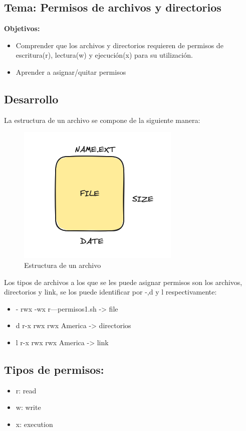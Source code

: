 \documentclass[11pt,twoside]{book}
\begin{document}
\subsection{Tema: Permisos de archivos y directorios}

\textbf{Objetivos:}
\begin{itemize}
  \item Comprender que los archivos y directorios requieren de permisos de escritura(r), lectura(w) y ejecución(x) para su utilización.
  \item Aprender a asignar/quitar permisos 
  \end{itemize}
\subsection*{Desarrollo}
La estructura de un archivo se compone de la siguiente manera:
\begin{figure}[htb]
  \centering
  \includegraphics[width=0.5\linewidth]{introduccion/lab6/archivo_estruc.PNG}
  \caption{Estructura de un archivo}
  \label{fig:etiqueta}
\end{figure}


Los tipos de archivos a los que se les puede asignar permisos son los archivos, directorios y link, se los puede identificar por -,d y l respectivamente:

\begin{itemize}
  \item -	rwx -wx r—permisos1.sh -> file
  \item d r-x rwx rwx America -> directorios
  \item l r-x rwx rwx America -> link
\end{itemize}
\subsection*{Tipos de permisos:}
\begin{itemize}
  \item r: read
  \item w: write
  \item x: execution 
\end{itemize}
\end{document}
